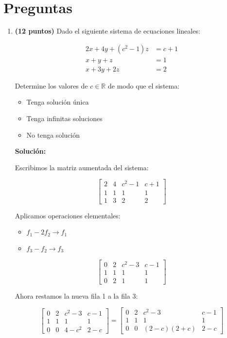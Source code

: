 \documentclass[a4paper]{article}
\begin{document}
\section*{Preguntas}
\begin{enumerate}


    \item \textbf{(12 puntos)} Dado el siguiente sistema de ecuaciones lineales:

\[
\begin{aligned}
2x + 4y + (c^2 - 1)z &= c + 1 \\
x + y + z &= 1 \\
x + 3y + 2z &= 2
\end{aligned}
\]

Determine los valores de \( c \in \mathbb{R} \) de modo que el sistema:

\begin{itemize}
    \item Tenga solución única
    \item Tenga infinitas soluciones
    \item No tenga solución
\end{itemize}

\textbf{Solución: }

Escribimos la matriz aumentada del sistema:

\[
\left[
\begin{array}{ccc|c}
2 & 4 & c^2 - 1 & c + 1 \\
1 & 1 & 1 & 1 \\
1 & 3 & 2 & 2
\end{array}
\right]
\]

Aplicamos operaciones elementales:

\begin{itemize}
    \item \( f_1 - 2f_2 \rightarrow f_1 \)
    \item \( f_3 - f_2\rightarrow f_3  \)
\end{itemize}

\[
\left[
\begin{array}{ccc|c}
0 & 2 & c^2 - 3 & c - 1 \\
1 & 1 & 1 & 1 \\
0 & 2 & 1 & 1
\end{array}
\right]
\]

Ahora restamos la nueva fila 1 a la fila 3:

\[
\left[
\begin{array}{ccc|c}
0 & 2 & c^2 - 3 & c - 1 \\
1 & 1 & 1 & 1 \\
0 & 0 & 4 - c^2 & 2 - c
\end{array}
\right]=\left[
\begin{array}{ccc|c}
0 & 2 & c^2 - 3 & c - 1 \\
1 & 1 & 1 & 1 \\
0 & 0 & (2-c)(2+c) & 2 - c
\end{array}
\right]
\]


\end{enumerate}
\end{document}
